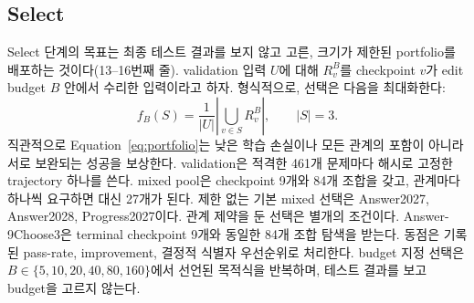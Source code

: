 \documentclass[10pt,conference]{IEEEtran}
\begin{document}
\subsection{Select}
\label{sec:select}
Select 단계의 목표는 최종 테스트 결과를 보지 않고 고른, 크기가 제한된 portfolio를 배포하는 것이다(13--16번째 줄). validation 입력 \(U\)에 대해 \(R_v^B\)를 checkpoint \(v\)가 edit budget \(B\) 안에서 수리한 입력이라고 하자. 형식적으로, 선택은 다음을 최대화한다:
\begin{equation}
 f_B(S)=\frac{1}{|U|}\left|\bigcup_{v\in S} R_v^B\right|,\qquad |S|=3.
\label{eq:portfolio}
\end{equation}
직관적으로 Equation~\eqref{eq:portfolio}는 낮은 학습 손실이나 모든 관계의 포함이 아니라 서로 보완되는 성공을 보상한다. validation은 적격한 461개 문제마다 해시로 고정한 trajectory 하나를 쓴다. mixed pool은 checkpoint 9개와 84개 조합을 갖고, 관계마다 하나씩 요구하면 대신 27개가 된다. 제한 없는 기본 mixed 선택은 Answer2027, Answer2028, Progress2027이다. 관계 제약을 둔 선택은 별개의 조건이다. Answer-9Choose3은 terminal checkpoint 9개와 동일한 84개 조합 탐색을 받는다. 동점은 기록된 pass-rate, improvement, 결정적 식별자 우선순위로 처리한다. budget 지정 선택은 \(B\in\{5,10,20,40,80,160\}\)에서 선언된 목적식을 반복하며, 테스트 결과를 보고 budget을 고르지 않는다.
\end{document}
